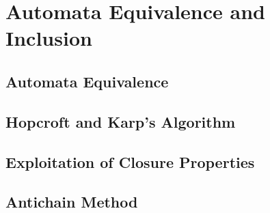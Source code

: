 \section{Automata Equivalence and Inclusion}

\subsection{Automata Equivalence}

\subsection{Hopcroft and Karp's Algorithm}

\subsection{Exploitation of Closure Properties}

\subsection{Antichain Method}

